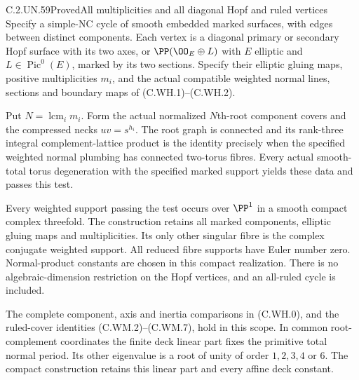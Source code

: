 \begin{statement}{C.2.UN.59}{Proved}{All multiplicities and all diagonal Hopf and ruled vertices}
Specify a simple-NC cycle of smooth embedded marked surfaces, with
edges between distinct components. Each vertex is a diagonal primary
or secondary Hopf surface with its two axes, or
$\PP(\OO_E\oplus L)$ with $E$ elliptic and
$L\in\operatorname{Pic}^0(E)$, marked by its two sections.
Specify their elliptic gluing maps, positive multiplicities $m_i$,
and the actual compatible weighted normal lines, sections and
boundary maps of (C.WH.1)--(C.WH.2).

Put $N=\operatorname{lcm}_i m_i$. Form the actual normalized
$N$th-root component covers and the compressed necks $uv=s^{h_i}$.
The root graph is connected and its rank-three integral
complement-lattice product is the identity precisely when the
specified weighted normal plumbing has connected two-torus fibres.
Every actual smooth-total torus degeneration with the specified
marked support yields these data and passes this test.

Every weighted support passing the test occurs over $\PP^1$ in a
smooth compact complex threefold. The construction retains all
marked components, elliptic gluing maps and multiplicities. Its
only other singular fibre is the complex conjugate weighted
support. All reduced fibre supports have Euler number zero.
Normal-product constants are chosen in this compact realization.
There is no algebraic-dimension restriction on the Hopf vertices,
and an all-ruled cycle is included.

The complete component, axis and inertia comparisons in
(C.WH.0), and the ruled-cover identities (C.WM.2)--(C.WM.7),
hold in this scope. In common root-complement coordinates the
finite deck linear part fixes the primitive total normal period.
Its other eigenvalue is a root of unity of order $1,2,3,4$ or $6$.
The compact construction retains this linear part and every
affine deck constant.
\end{statement}

